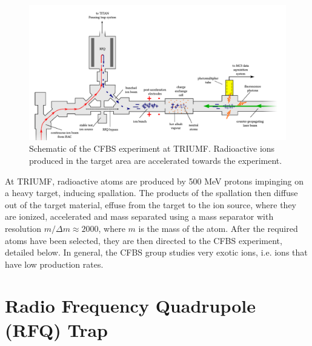 \begin{figure}[h]
\includegraphics[width=\textwidth]{Laser_spec_triumf/experiment.png}
\caption[Schematic of the CFBS experiment at TRIUMF]{\small Schematic of the CFBS experiment at TRIUMF.\cite{CFBS} Radioactive ions produced in the target area are accelerated towards the experiment.}
\label{exp}
\end{figure}

At TRIUMF, radioactive atoms are produced by 500 MeV protons impinging on a heavy target, inducing spallation. The products of the spallation then diffuse out of the target material, effuse from the target to the ion source, where they are ionized, accelerated and mass separated using a mass separator with resolution $m/\Delta m \approx 2000$, where $m$ is the mass of the atom. \cite{CFBS} After the required atoms have been selected, they are then directed to the CFBS experiment, detailed below. In general, the CFBS group studies very exotic ions, i.e. ions that have low production rates.

\section{Radio Frequency Quadrupole (RFQ) Trap}

